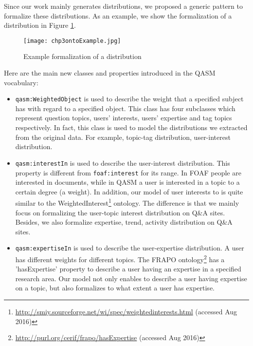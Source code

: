 Since our work mainly generates distributions, we proposed a generic pattern to formalize these distributions. As an example, we show the formalization of a distribution in Figure \ref{fig:chp3ontoexample}. 

\begin{figure}%
\centering
\texttt{[image: chp3ontoExample.jpg]}  
\caption{Example formalization of a distribution}
\label{fig:chp3ontoexample} 
\end{figure}

Here are the main new classes and properties introduced in the QASM vocabulary: 

\begin{itemize}

\item \texttt{qasm:WeightedObject} is used to describe the weight that a specified subject has with regard to a specified object. This class has four subclasses which represent question topics, users' interests, users' expertise and tag topics respectively. In fact, this class is used to model the distributions we extracted from the original data. For example, topic-tag distribution, user-interest distribution.

\item \texttt{qasm:interestIn} is used to describe the user-interest distribution. This property is different from \texttt{foaf:interest} for its range. In FOAF people are interested in documents, while in QASM a user is interested in a topic to a certain degree (a weight). In addition, our model of user interests to is quite similar to the WeightedInterest\footnote{\url{http://smiy.sourceforge.net/wi/spec/weightedinterests.html} (accessed Aug 2016)} ontology. The difference is that we mainly focus on formalizing the user-topic interest distribution on Q\&A sites. Besides, we also formalize expertise, trend, activity distribution on Q\&A sites.

\item \texttt{qasm:expertiseIn} is used to describe the user-expertise distribution. A user has different weights for different topics. The FRAPO ontology\footnote{\url{http://purl.org/cerif/frapo/hasExpertise} (accessed Aug 2016) } has a 'hasExpertise' property to describe a user having an expertise in a specified research area. Our model not only enables to describe a user having expertise on a topic, but also formalizes to what extent a user has expertise.


\end{itemize}
